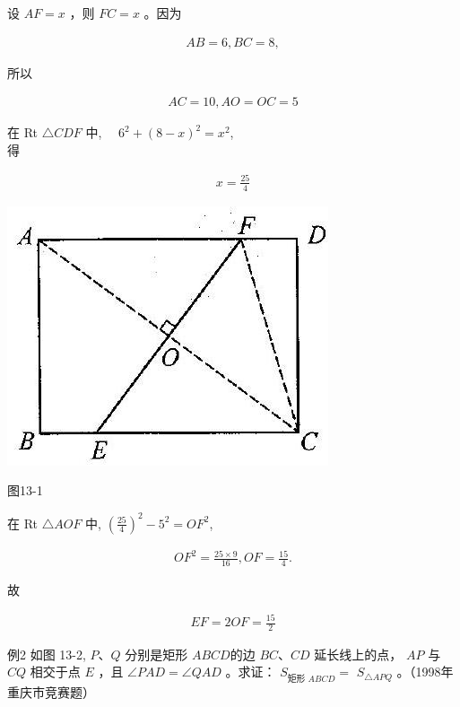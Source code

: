 \documentclass[10pt]{article}
\begin{document}
设 $A F=x$ ，则 $F C=x$ 。因为

\begin{align*}
A B=6, B C=8,
\end{align*}

所以

\begin{align*}
A C=10, A O=O C=5
\end{align*}

在 Rt $\triangle C D F$ 中, $\quad 6^{2}+(8-x)^{2}=x^{2}$,\\
得

\begin{align*}
x=\frac{25}{4}
\end{align*}

\begin{center}
\includegraphics[max width=\textwidth]{2024_10_30_2c8f45efd4a519b08e1ag-120(1)}
\end{center}

图13-1

在 Rt $\triangle A O F$ 中, $\left(\frac{25}{4}\right)^{2}-5^{2}=O F^{2}$,

\begin{align*}
O F^{2}=\frac{25 \times 9}{16}, O F=\frac{15}{4} .
\end{align*}

故

\begin{align*}
E F=2 O F=\frac{15}{2}
\end{align*}

例2 如图 13-2, $P 、 Q$ 分别是矩形 $A B C D$的边 $B C 、 C D$ 延长线上的点， $A P$ 与 $C Q$ 相交于点 $E$ ，且 $\angle P A D=\angle Q A D$ 。求证： $S_{\text {矩形 } A B C D}=$ $S_{\triangle A P Q}$ 。（1998年重庆市竞赛题）
\end{document}
